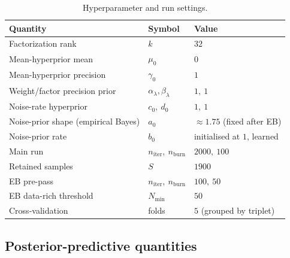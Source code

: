 \begin{table}[htbp]
\centering
\caption{Hyperparameter and run settings.}
\label{tab:hyper}
\small
\begin{tabular}{lll}
\toprule
\textbf{Quantity} & \textbf{Symbol} & \textbf{Value} \\
\midrule
Factorization rank            & $k$                       & $32$ \\
Mean-hyperprior mean          & $\mu_0$                   & $0$ \\
Mean-hyperprior precision     & $\gamma_0$                & $1$ \\
Weight/factor precision prior & $\alpha_\lambda,\beta_\lambda$ & $1,\ 1$ \\
Noise-rate hyperprior         & $c_0,\ d_0$               & $1,\ 1$ \\
Noise-prior shape (empirical Bayes) & $a_0$               & $\approx 1.75$ (fixed after EB) \\
Noise-prior rate              & $b_0$                     & initialised at $1$, learned \\
Main run                      & $n_{\mathrm{iter}},\ n_{\mathrm{burn}}$ & $2000,\ 100$ \\
Retained samples              & $S$                       & $1900$ \\
EB pre-pass                   & $n_{\mathrm{iter}},\ n_{\mathrm{burn}}$ & $100,\ 50$ \\
EB data-rich threshold        & $N_{\min}$                & $50$ \\
Cross-validation              & folds                     & $5$ (grouped by triplet) \\
\bottomrule
\end{tabular}
\end{table}

\subsection{Posterior-predictive quantities}
\label{sec:predictive}


